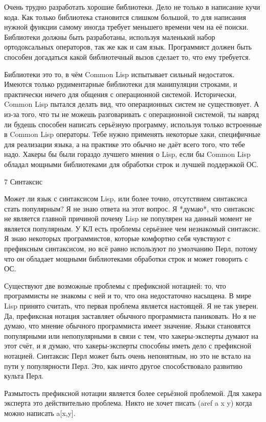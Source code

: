 \documentclass[ebook,12pt,oneside,openany]{memoir}
\begin{document}
Очень трудно разработать хорошие библиотеки. Дело не только в
написание кучи кода. Как только библиотека становится слишком большой,
то для написания нужной функции самому иногда требует меньшего времени
чем на её поиски. Библиотеки должны быть разработаны, используя
маленький набор ортодоксальных операторов, так же как и сам язык.
Программист должен быть способен догадаться какой библиотечный вызов
сделает то, что ему требуется.

Библиотеки это то, в чём Common Lisp испытывает сильный недостаток.
Имеются только рудиментарные библиотеки для манипуляции строками, и
практически ничего для общения с операционной системой. Исторически,
Common Lisp пытался делать вид, что операционных систем не
существовует. А из-за того, что ты не можешь разговаривать с
операционной системой, ты навряд ли будешь способен написать серьёзную
программу, используя только встроенные в Common Lisp операторы. Тебе
нужно применять некоторые хаки, специфичные для реализации языка, а на
практике это обычно не даёт всего того, что тебе надо. Хакеры бы были
гораздо лучшего мнения о Lisp, если бы Common Lisp обладал мощными
библиотеками для обработки строк и лучшей поддержкой ОС.

7 Синтаксис

Может ли язык с синтаксисом Lisp, или более точно, отсутствием
синтаксиса стать популярным? Я не знаю ответа на этот вопрос. Я
*думаю*, что синтаксис не является главной причиной почему Lisp не
популярен на данный момент не является популярным. У КЛ есть проблемы
серьёзнее чем незнакомый синтаксис. Я знаю некоторых программистов,
которые комфортно себя чувствуют с префиксным синтаксисом, но всё
равно используют по умолчанию Перл, потому что он обладает мощными
библиотеками обработки строк и может говорить с ОС.

Существуют две возможные проблемы с префиксной нотацией: то, что
программисты не знакомы с ней и то, что она недостаточно насыщена. В
мире Lisp принято считать, что первая проблема является настоящей. Я
не так уверен. Да, префиксная нотация заставляет обычного программиста
паниковать. Но я не думаю, что мнение обычного программиста имеет
значение. Языки становятся популярными или непопулярными в связи с
тем, что хакеры-эксперты думают на этот счёт, и я думаю, что
хакеры-эксперты способны иметь дело с префиксной нотацией. Синтаксис
Перл может быть очень непонятным, но это не встало на пути у
популярности Перл. Это, как ничто другое способствовало развитию
культа Перл.

Размытость префиксной нотации является более серьёзной проблемой. Для
хакера эксперта это действительно проблема. Никто не хочет писать
(aref a x y) когда можно написать a[x,y].
\end{document}
